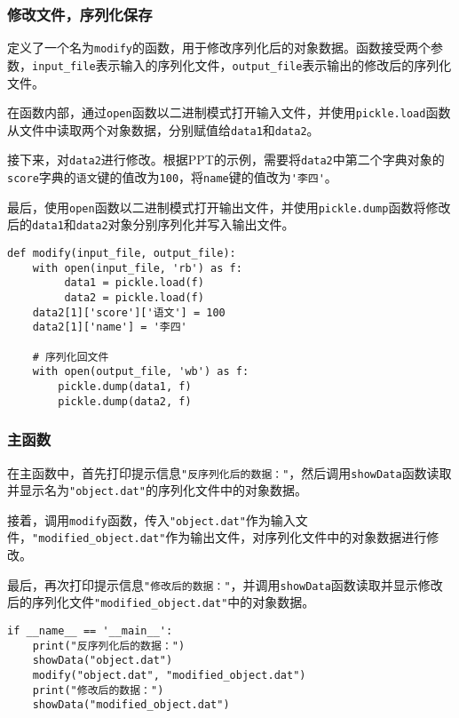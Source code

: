 \documentclass[lang=cn,11pt,a4paper]{elegantpaper}
\begin{document}
\subsubsection{修改文件，序列化保存}
定义了一个名为\lstinline{modify}的函数，用于修改序列化后的对象数据。函数接受两个参数，\lstinline{input_file}表示输入的序列化文件，\lstinline{output_file}表示输出的修改后的序列化文件。

在函数内部，通过\lstinline{open}函数以二进制模式打开输入文件，并使用\lstinline{pickle.load}函数从文件中读取两个对象数据，分别赋值给\lstinline{data1}和\lstinline{data2}。

接下来，对\lstinline{data2}进行修改。根据PPT的示例，需要将\lstinline{data2}中第二个字典对象的\lstinline{score}字典的\lstinline{语文}键的值改为\lstinline{100}，将\lstinline{name}键的值改为\lstinline{'李四'}。

最后，使用\lstinline{open}函数以二进制模式打开输出文件，并使用\lstinline{pickle.dump}函数将修改后的\lstinline{data1}和\lstinline{data2}对象分别序列化并写入输出文件。

\begin{lstlisting}
def modify(input_file, output_file):
    with open(input_file, 'rb') as f:
         data1 = pickle.load(f)
         data2 = pickle.load(f)
    data2[1]['score']['语文'] = 100
    data2[1]['name'] = '李四'

    # 序列化回文件
    with open(output_file, 'wb') as f:
        pickle.dump(data1, f)
        pickle.dump(data2, f)
\end{lstlisting}

\subsubsection{主函数}

在主函数中，首先打印提示信息\lstinline{"反序列化后的数据："}，然后调用\lstinline{showData}函数读取并显示名为\lstinline{"object.dat"}的序列化文件中的对象数据。

接着，调用\lstinline{modify}函数，传入\lstinline{"object.dat"}作为输入文件，\lstinline{"modified_object.dat"}作为输出文件，对序列化文件中的对象数据进行修改。

最后，再次打印提示信息\lstinline{"修改后的数据："}，并调用\lstinline{showData}函数读取并显示修改后的序列化文件\lstinline{"modified_object.dat"}中的对象数据。

\begin{lstlisting}
if __name__ == '__main__':
    print("反序列化后的数据：")
    showData("object.dat")
    modify("object.dat", "modified_object.dat")
    print("修改后的数据：")
    showData("modified_object.dat")
\end{lstlisting}
\end{document}
